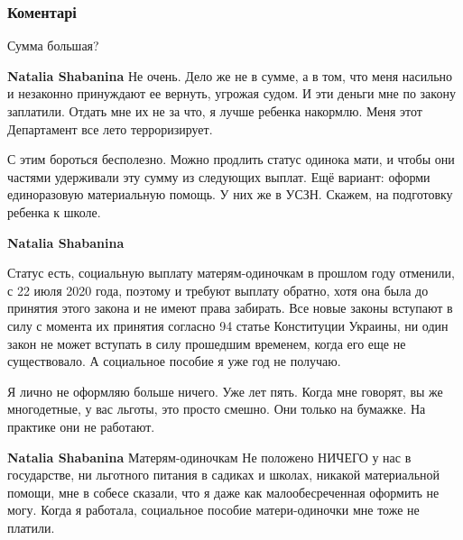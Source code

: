  
 
 
 
 
\subsubsection{Коментарі}
\label{sec:28_08_2021.fb.glyva_marina.zaporozhie.1.bespredel_ukraina.cmt}

\begin{itemize} %
Сумма большая?

\begin{itemize} %
\textbf{Natalia Shabanina} Не очень. Дело же не в сумме, а в том, что меня насильно и незаконно принуждают ее вернуть, угрожая судом. И эти деньги мне по закону заплатили. Отдать мне их не за что, я лучше ребенка накормлю. Меня этот Департамент все лето терроризирует.


С этим бороться бесполезно. Можно продлить статус одинока мати, и чтобы они
частями удерживали эту сумму из следующих выплат. Ещё вариант: оформи
единоразовую материальную помощь. У них же в УСЗН. Скажем, на подготовку
ребенка к школе.

\textbf{Natalia Shabanina} 

Статус есть, социальную выплату матерям-одиночкам в прошлом году отменили, с 22
июля 2020 года, поэтому и требуют выплату обратно, хотя она была до принятия
этого закона и не имеют права забирать. Все новые законы вступают в силу с
момента их принятия согласно 94 статье Конституции Украины, ни один закон не
может вступать в силу прошедшим временем, когда его еще не существовало. А
социальное пособие я уже год не получаю.


Я лично не оформляю больше ничего. Уже лет пять. Когда мне говорят, вы же
многодетные, у вас льготы, это просто смешно. Они только на бумажке. На
практике они не работают.

\textbf{Natalia Shabanina} Матерям-одиночкам Не положено НИЧЕГО у нас в государстве, ни льготного питания в садиках и школах, никакой материальной помощи, мне в собесе сказали, что я даже как малообесреченная оформить не могу. Когда я работала, социальное пособие матери-одиночки мне тоже не платили.


\end{itemize}
\end{itemize}
